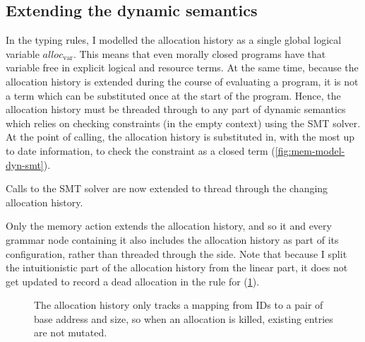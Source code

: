 \subsection{Extending the dynamic semantics}

In the typing rules, I modelled the allocation history as a single global
logical variable $\mathit{alloc}_\mathrm{var}$. This means that even morally
closed programs have that variable free in explicit logical and resource terms.
At the same time, because the allocation history is extended during the course
of evaluating a  program, it is not a term which can be substituted
once at the start of the program. Hence, the allocation history must
be threaded through to any part of dynamic semantics which relies on checking
constraints (in the empty context) using the SMT solver. At the point of
calling, the allocation history is substituted in, with the most up to date
information, to check the constraint as a closed term (\cref{fig:mem-model-dyn-smt}).

\begin{marginfigure}
    \small%
    \cndefnSubsXXSMT{}
    \caption{Calls to the SMT solver are now extended to thread through the
        changing allocation history.}\label{fig:mem-model-dyn-smt}
\end{marginfigure}

Only the  memory action extends the allocation history, and
so it and every grammar node containing it also includes the allocation history
as part of its configuration, rather than threaded through the
side. Note that
because I split the intuitionistic part of the allocation history from the
linear part, it does not get updated to record a dead allocation in the
rule for  (\cref{fig:mem-model-dyn-create-kill}).

\begin{figure}
    \small%
    \raggedright%
    \begingroup%
    \NewCommandCopy{\origcndruleOpXXActionXXCreate}{\cndruleOpXXActionXXCreate}
    \renewcommand{\cndruleOpXXActionXXCreate}{\onlyUseNthCnPremise{1,2,3,7,8}{\origcndruleOpXXActionXXCreate{}}}
    \onlyUseRules{\cndefnOpXXAction{}}{%
        \cndruleOpXXActionXXCreate{},
        \cndruleOpXXActionXXKillXXStatic{}
    }
    \endgroup%
    \caption{The allocation history only tracks a mapping from IDs to a pair of
        base address and size, so when an allocation is killed, existing entries
        are not mutated.}\label{fig:mem-model-dyn-create-kill}
\end{figure}


